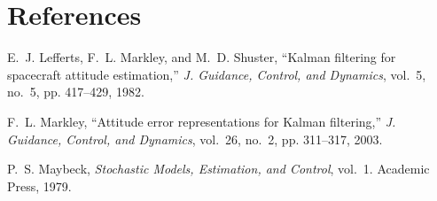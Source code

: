 \documentclass[12pt]{article}
\begin{document}
\section*{References}
\begin{thebibliography}{9}
E.~J. Lefferts, F.~L. Markley, and M.~D. Shuster, “Kalman filtering for spacecraft attitude estimation,” \emph{J. Guidance, Control, and Dynamics}, vol.~5, no.~5, pp. 417–429, 1982.

F.~L. Markley, “Attitude error representations for Kalman filtering,” \emph{J. Guidance, Control, and Dynamics}, vol.~26, no.~2, pp. 311–317, 2003.

P.~S. Maybeck, \emph{Stochastic Models, Estimation, and Control}, vol.~1. Academic Press, 1979.

\end{thebibliography}
\end{document}
